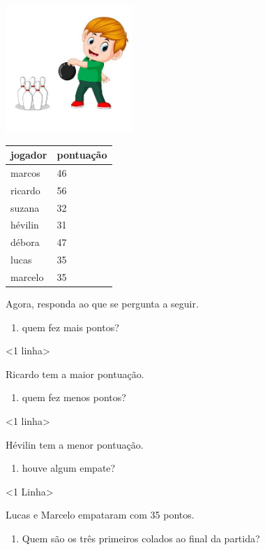 \includegraphics[width=1.88542in,height=1.88542in]{media/image95.jpg}

\begin{longtable}[]{@{}ll@{}}
\toprule
jogador & pontuação\tabularnewline
\midrule
\endhead
marcos & 46\tabularnewline
ricardo & 56\tabularnewline
suzana & 32\tabularnewline
hévilin & 31\tabularnewline
débora & 47\tabularnewline
lucas & 35\tabularnewline
marcelo & 35\tabularnewline
\bottomrule
\end{longtable}

Agora, responda ao que se pergunta a seguir.

\begin{enumerate}
\def\labelenumi{\Alph{enumi})}
\item
  quem fez mais pontos?
\end{enumerate}

\textless{}1 linha\textgreater{}

Ricardo tem a maior pontuação.

\begin{enumerate}
\def\labelenumi{\Alph{enumi})}
\item
  quem fez menos pontos?
\end{enumerate}

\textless{}1 linha\textgreater{}

Hévilin tem a menor pontuação.

\begin{enumerate}
\def\labelenumi{\Alph{enumi})}
\item
  houve algum empate?
\end{enumerate}

\textless{}1 Linha\textgreater{}

Lucas e Marcelo empataram com 35 pontos.

\begin{enumerate}
\def\labelenumi{\Alph{enumi})}
\item
  Quem são os três primeiros colados ao final da partida?
\end{enumerate}

